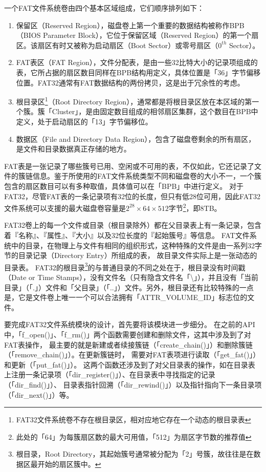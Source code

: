 \noindent 一个FAT文件系统卷由四个基本区域组成，它们顺序排列如下：
\begin{enumerate}[noitemsep,topsep=0pt,parsep=0pt,partopsep=0pt,leftmargin=1cm]
    \item[0) ––]
保留区（Reserved Region），磁盘卷上第一个重要的数据结构被称作BPB（BIOS Parameter Block），它位于保留区域（Reserved Region）的第一个扇区。该扇区有时又被称为启动扇区（Boot Sector）或零号扇区（$0^{th}$ Sector）。
    \item[1) ––]
FAT表区（FAT Region），文件分配表，是由一些32比特大小的记录项组成的表，它所占据的扇区数目同样在BPB结构用定义，具体位置是「36」字节偏移位置。FAT32通常有FAT数据结构的两份拷贝，这是出于冗余性的考虑。
    \item[2) ––]
根目录区\footnote{FAT32文件系统卷不存在根目录区，相对应地它存在一个动态的根目录表}（Root Directory Region），通常都是将根目录区放在本区域的第一个簇。簇「Cluster」，是由固定数目组成的相邻扇区集群，这个数目在BPB中定义，处于启动扇区的「13」字节偏移位。
    \item[3) ––]
数据区（File and Directory Data Region），包含了磁盘卷剩余的所有扇区，是文件和目录数据真正存储的地方。
\end{enumerate}

FAT表是一张记录了哪些簇号已用、空闲或不可用的表，不仅如此，它还记录了文件的簇链信息。鉴于所使用的FAT文件系统类型不同和磁盘卷的大小不一，一个簇包含的扇区数目可以有多种取值，具体值可以在「BPB」中进行定义。
对于FAT32，尽管FAT表的一条记录项有32位的长度，但只有低28位可用，因此FAT32文件系统可以支援的最大磁盘卷容量是$2^{28} \times 64 \times 512$字节\footnote{此处的「64」为每簇扇区数的最大可用值，「512」为扇区字节数的推荐值}，即8TB。

FAT32卷上的每一个文件或目录（根目录除外）都在父目录表上有一条记录，包含着『名称』、『属性』、『大小』以及32位长度的『起始簇号』等信息。
FAT文件系统中的目录，在物理上与文件有相同的组织形式，这种特殊的文件是由一系列32字节的目录记录（Directory Entry）所组成的表，
故目录文件实际上是一张动态的目录表。
FAT32的根目录\footnote{根目录，Root Directory，其起始簇号通常被分配为「2」号簇，故往往是在数据区最开始的扇区簇中。}的与普通目录的不同之处在于，根目录没有时间戳（Date or Time Stamps），没有文件名（只有隐含文件名「\textbackslash」），并且没有「当前目录」（「.」）文件和「父目录」（「..」）文件。另外，根目录还有比较特殊的一点是，它是文件卷上唯一一个可以合法拥有「ATTR\_VOLUME\_ID」标志位的文件。

要完成FAT32文件系统模块的设计，首先要将该模块进一步细分。
在之前的API中，「f\_open()」、「f\_rm()」两个函数需要创建和删除文件，这其中涉及到了对FAT表操作，
最主要的就是新建或者续接簇链（「create\_chain()」）和删除簇链（「remove\_chain()」）。在更新簇链时，
需要对FAT表项进行读取（「get\_fat()」）和更新（「put\_fat()」）。
这两个函数还涉及到了对父目录表的操作，如在目录表上注册一条记录项（「dir\_register()」）、在目录表中寻找指定的记录（「dir\_find()」）、
目录表指针回溯（「dir\_rewind()」）以及指针指向下一条目录项（「dir\_next()」）等。

